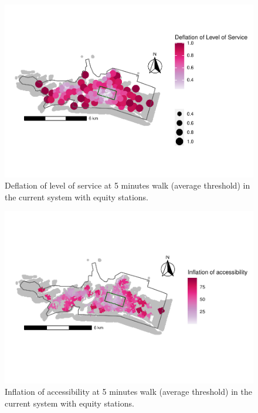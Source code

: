 \documentclass[]{elsarticle} %
\begin{document}
\begin{figure}

{\centering \includegraphics[width=0.9\linewidth]{Bike-share-spatial-equity_files/figure-latex/figure-10-1} 

}

\caption{Deflation of level of service at 5 minutes walk (average threshold) in the current system with equity stations.}\label{fig:figure-10}
\end{figure}

\begin{figure}

{\centering \includegraphics[width=0.9\linewidth]{Bike-share-spatial-equity_files/figure-latex/figure-11-1} 

}

\caption{Inflation of accessibility at 5 minutes walk (average threshold) in the current system with equity stations.}\label{fig:figure-11}
\end{figure}
\end{document}
